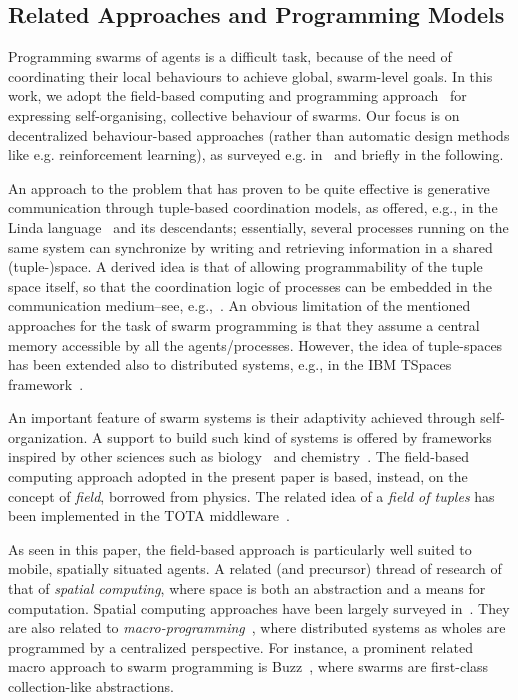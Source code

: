\subsection{Related Approaches and Programming Models}
\label{s:rw:related-approaches}

Programming swarms of agents is a difficult task, because of the need of coordinating their local behaviours to achieve global, swarm-level goals.
%
In this work, we adopt the field-based computing and programming approach~\cite{DBLP:journals/jlap/ViroliBDACP19}
 for expressing self-organising, collective behaviour of swarms.
%
Our focus is on decentralized behaviour-based approaches (rather than automatic design methods like e.g. reinforcement learning),
 as surveyed e.g. in~\cite{DBLP:journals/swarm/BrambillaFBD13,DBLP:journals/jlap/ViroliBDACP19}
 and briefly in the following.

%
An approach to the problem that has proven to be quite effective is generative communication through tuple-based coordination models, as offered, e.g., in the Linda language~\cite{linda} and its descendants; essentially, several processes running on the same system can synchronize by writing and retrieving information in a shared (tuple-)space.
A derived idea is that of allowing programmability of the tuple space itself, so that the coordination logic of processes can be embedded in the communication medium--see, e.g.,~\cite{respect-scico2001}.
An obvious limitation of the mentioned approaches for the task of swarm programming is that they assume a central memory accessible by all the agents/processes. However, the idea of tuple-spaces has been extended also to distributed systems, e.g., in the IBM TSpaces framework~\cite{Wyckoff:1998}.

An important feature of swarm systems is their adaptivity achieved through self-organization.
%
A support to build such kind of systems is offered by frameworks inspired by other sciences such as biology~\cite{tolksdorf2003using} and chemistry~\cite{DBLP:journals/alife/Sayama09}.
%
The field-based computing approach adopted in the present paper is based, instead, on the concept of {\em field}, borrowed from physics.
%
The related idea of a {\em field of tuples} has been implemented in the TOTA middleware~\cite{tota}.

As seen in this paper, the field-based approach is particularly well suited to mobile, spatially situated agents.
%
A related (and precursor) thread of research of that of {\em spatial computing},
 where space is both an abstraction and a means for computation.
%
Spatial computing approaches have been largely surveyed in~\cite{SpatialIGI2013}.
%
They are also related to \emph{macro-programming}~\cite{DBLP:conf/ipsn/NewtonMW07},
 where distributed systems as wholes are programmed by a centralized perspective.
%
For instance, a prominent related macro approach to swarm programming
 is Buzz~\cite{DBLP:journals/software/PinciroliB16},
 where swarms are first-class collection-like abstractions.

